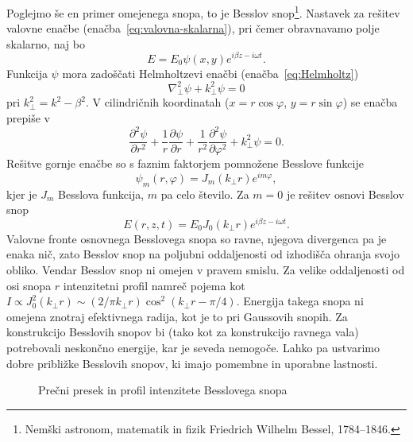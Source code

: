 Poglejmo še en primer omejenega snopa, to je Besslov
snop\footnote{Nemški astronom, matematik in fizik Friedrich Wilhelm Bessel, 1784--1846.}. 
Nastavek za rešitev valovne enačbe (enačba~\ref{eq:valovna-skalarna}), 
pri čemer obravnavamo polje skalarno, naj bo
\begin{equation}
E=E_{0}\psi(x,y)e^{i\beta z-i\omega t}.
\end{equation}
Funkcija $\psi$ mora zadoščati Helmholtzevi enačbi
(enačba~\ref{eq:Helmholtz})
\begin{equation}
\nabla_{\perp}^{2}\psi+k_{\perp}^{2}\psi=0
\end{equation}
pri $k_{\perp}^{2}=k^{2}-\beta^{2}$. V cilindričnih
koordinatah ($x=r\cos\varphi$, $y=r\sin\varphi$) se enačba prepiše v 
\begin{equation}
\frac{\partial^2 \psi}{\partial r^2}+ \frac{1}{r}\frac{\partial \psi}{\partial r}
+ \frac{1}{r^2}\frac{\partial^2 \psi}{\partial \varphi^2}+k_{\perp}^{2}\psi=0.
\end{equation}
Rešitve gornje enačbe so s faznim faktorjem pomnožene Besslove funkcije
\begin{equation}
\psi_m(r, \varphi)=J_{m}(k_{\perp}r)e^{im\varphi},
\end{equation}
kjer je $J_{m}$ Besslova funkcija, $m$ pa celo število. Za
$m=0$ je rešitev osnovi Besslov snop
\begin{equation}
E(r,z,t)=E_{0}J_{0}(k_{\perp}r)e^{i\beta z-i \omega t}.
\label{eq:Besslov-snop}
\end{equation}
Valovne fronte osnovnega Besslovega snopa so ravne, njegova divergenca pa je 
enaka nič, zato Besslov snop na
poljubni oddaljenosti od izhodišča ohranja svojo obliko. Vendar Besslov snop ni 
omejen v pravem smislu. Za velike oddaljenosti od osi snopa $r$ intenzitetni profil 
namreč pojema kot $I \propto J_{0}^{2}(k_{\perp}r)\sim (2/\pi k_{\perp}r)\cos^{2}(k_{\perp}r-\pi/4)$.
Energija takega snopa ni omejena znotraj efektivnega radija,
kot je to pri Gaussovih snopih. Za konstrukcijo Besslovih snopov
bi (tako kot za konstrukcijo ravnega vala) potrebovali neskončno energije,
kar je seveda nemogoče. Lahko pa ustvarimo dobre približke Besslovih 
snopov, ki imajo pomembne in uporabne lastnosti. 

\begin{figure}[h]
\centering
\def\svgwidth{70truemm} 

\caption{Prečni presek in profil intenzitete Besslovega snopa}
\label{fig:Besslov_presek}
\end{figure}

